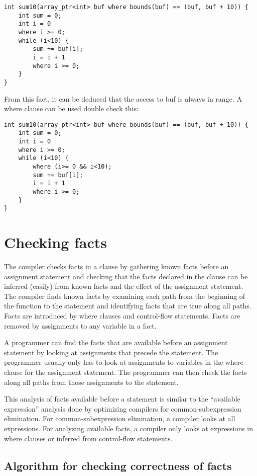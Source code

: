 \begin{verbatim}
int sum10(array_ptr<int> buf where bounds(buf) == (buf, buf + 10)) {
    int sum = 0;
    int i = 0
    where i >= 0;
    while (i<10) {
        sum += buf[i];
        i = i + 1
        where i >= 0;
    }
}
\end{verbatim}

From this fact, it can be deduced that the access to buf is always in
range. A where clause can be used double check this:

\begin{verbatim}
int sum10(array_ptr<int> buf where bounds(buf) == (buf, buf + 10)) {
    int sum = 0;
    int i = 0
    where i >= 0;
    while (i<10) {
        where (i>= 0 && i<10);
        sum += buf[i];
        i = i + 1
        where i >= 0;
    }
}
\end{verbatim}

\section{Checking facts}

The compiler checks facts in a  clause by gathering known
facts before an assignment statement and checking that the facts
declared in the  clause can be inferred (easily) from
known facts and the effect of the assignment statement. The compiler
finds known facts by examining each path from the beginning of the
function to the statement and identifying facts that are true along all
paths. Facts are introduced by where clauses and control-flow
statements. Facts are removed by assignments to any variable in a fact.

A programmer can find the facts that are available before an assignment
statement by looking at assignments that precede the statement. The
programmer usually only has to look at assignments to variables in the
where clause for the assignment statement. The programmer can then check
the facts along all paths from those assignments to the statement.

This analysis of facts available before a statement is similar to the
``available expression'' analysis done by optimizing compilers for
common-subexpression elimination. For common-subexpression elimination,
a compiler looks at all expressions. For analyzing available facts, a
compiler only looks at expressions in where clauses or inferred from
control-flow statements.

\subsection{Algorithm for checking correctness of facts}

